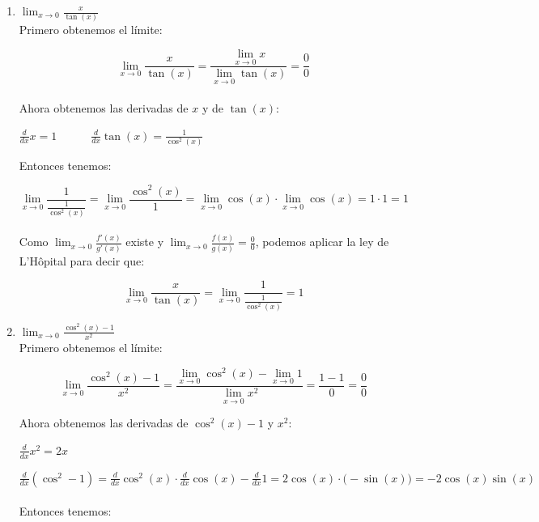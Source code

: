 \documentclass[12pt]{article}
\begin{document}
\begin{enumerate}[\hspace{9px} a)]
    \item \(\displaystyle\lim_{x \to 0}\frac{x}{\tan(x)}\)\\

        Primero obtenemos el l\'imite:

        \[\displaystyle\lim_{x \to 0}\frac{x}{\tan(x)} = \frac{\displaystyle\lim_{x \to 0}x}{\displaystyle\lim_{x \to 0}\tan(x)}=\frac{0}{0}\]\\

        Ahora obtenemos las derivadas de $x$ y de $\tan(x)$:

        \(\displaystyle\frac{d}{dx}x=1 \qquad \quad \frac{d}{dx}\tan(x)=\frac{1}{\cos^2(x)}\)\medskip
        
        Entonces tenemos:

        \[\displaystyle\lim_{x \to 0}\frac{1}{\displaystyle\frac{1}{\cos^2(x)}}=\lim_{x \to 0}\frac{\cos^2(x)}{1}=\lim_{x \to 0}\cos(x) \cdot \lim_{x \to 0}\cos(x)=1 \cdot 1=1\]\\

        Como \(\displaystyle\lim_{x \to 0}\frac{f'(x)}{g'(x)}\) existe y \(\displaystyle\lim_{x \to 0}\frac{f(x)}{g(x)}=\frac{0}{0}\), podemos aplicar la ley de L'H\^opital para decir que:

        \[\displaystyle\lim_{x \to 0}\frac{x}{\tan(x)}=\lim_{x \to 0}\frac{1}{\displaystyle\frac{1}{\cos^2(x)}}=1\]
    \item \(\displaystyle\lim_{x \to 0}\frac{\cos^2(x)-1}{x^2}\)\\
    
        Primero obtenemos el l\'imite:

        \[\displaystyle\lim_{x \to 0}\frac{\cos^2(x)-1}{x^2} = \frac{\displaystyle\lim_{x \to 0}\cos^2(x)-\lim_{x \to 0}1}{\displaystyle\lim_{x \to 0}x^2}=\frac{1-1}{0}=\frac{0}{0}\]

        Ahora obtenemos las derivadas de $\cos^2(x)-1$ y $x^2$:

        \(\displaystyle\frac{d}{dx}x^2=2x\)

        \(\displaystyle\frac{d}{dx}(\cos^2-1)=\frac{d}{dx}\cos^2(x) \cdot \frac{d}{dx}\cos(x) - \frac{d}{dx}1=2\cos(x)\cdot \big(-\sin(x)\big)=-2\cos(x)\sin(x)\)\\ \\

        Entonces tenemos:


\end{enumerate}
\end{document}
